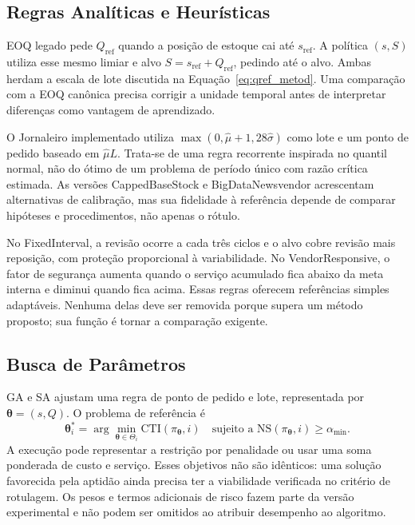 \subsection{Regras Analíticas e Heurísticas}

EOQ legado pede $Q_{\mathrm{ref}}$ quando a posição de estoque cai até $s_{\mathrm{ref}}$. A política $(s,S)$ utiliza esse mesmo limiar e alvo $S=s_{\mathrm{ref}}+Q_{\mathrm{ref}}$, pedindo até o alvo. Ambas herdam a escala de lote discutida na Equação~\ref{eq:qref_metod}. Uma comparação com a EOQ canônica precisa corrigir a unidade temporal antes de interpretar diferenças como vantagem de aprendizado.

O Jornaleiro implementado utiliza $\max(0,\hat\mu+1{,}28\hat\sigma)$ como lote e um ponto de pedido baseado em $\hat\mu L$. Trata-se de uma regra recorrente inspirada no quantil normal, não do ótimo de um problema de período único com razão crítica estimada. As versões CappedBaseStock e BigDataNewsvendor acrescentam alternativas de calibração, mas sua fidelidade à referência depende de comparar hipóteses e procedimentos, não apenas o rótulo.

No FixedInterval, a revisão ocorre a cada três ciclos e o alvo cobre revisão mais reposição, com proteção proporcional à variabilidade. No VendorResponsive, o fator de segurança aumenta quando o serviço acumulado fica abaixo da meta interna e diminui quando fica acima. Essas regras oferecem referências simples adaptáveis. Nenhuma delas deve ser removida porque supera um método proposto; sua função é tornar a comparação exigente.

\subsection{Busca de Parâmetros}

GA e SA ajustam uma regra de ponto de pedido e lote, representada por $\boldsymbol\theta=(s,Q)$. O problema de referência é
\begin{equation}
\boldsymbol\theta_i^*=\arg\min_{\boldsymbol\theta\in\Theta_i}\mathrm{CTI}(\pi_{\boldsymbol\theta},i)
\quad\text{sujeito a }\mathrm{NS}(\pi_{\boldsymbol\theta},i)\geq\alpha_{\min}.
\label{eq:obj_metaheuristicas}
\end{equation}
A execução pode representar a restrição por penalidade ou usar uma soma ponderada de custo e serviço. Esses objetivos não são idênticos: uma solução favorecida pela aptidão ainda precisa ter a viabilidade verificada no critério de rotulagem. Os pesos e termos adicionais de risco fazem parte da versão experimental e não podem ser omitidos ao atribuir desempenho ao algoritmo.

